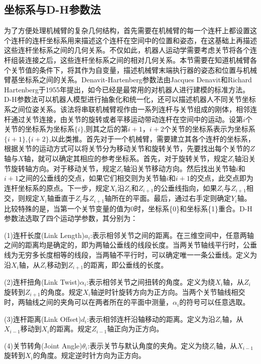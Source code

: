 \documentclass[12pt,a4paper,openany,oneside]{book}%
\numberwithin{equation}{chapter}%
\numberwithin{figure}{chapter}%
\begin{document}
\subsection{坐标系与D-H参数法}
为了方便处理机械臂的复杂几何结构，首先需要在机械臂的每一个连杆上都设置这个连杆的连杆坐标系用来描述这个连杆在空间中的位置和姿态，在这基础上再描述这些连杆坐标系之间的几何关系。不仅如此，机器人运动学需要考虑关节将各个连杆组装连接之后，这些连杆坐标系之间的相对几何关系。本节需要在知道机械臂各个关节值的条件下，将其作为自变量，描述机械臂末端执行器的姿态和位置与机械臂基坐标系之间的关系。Denavit-Hartenberg参数法\cite{r21}由Jacques Denavit和Richard Hartenberg于1955年提出，如今已经是最常用的对机器人进行建模的标准方法。D-H参数法可以机器人模型进行抽象化和统一化，还可以描述机器人不同关节坐标系之间位姿关系。该法将串联机械臂视作由一系列连杆与关节组成的刚体，相邻连杆通过关节连接，由关节的旋转或者平移运动带动连杆在空间中的运动。设第$i$个关节的坐标系为坐标系$\{i\}$,则其之后的第$i+1$，$i+2$个关节的坐标系表示为坐标系$\{i+1\}$,$\{i+2\}$,以此类推。首先对于一个机械臂，需要建立其各个连杆的坐标系，根据关节的运动方式可以将关节分为移动关节和旋转关节，先要找出每个关节的$Z$轴与$X$轴，就可以确定其相应的参考坐标系。首先，对于旋转关节，规定$Z_i$轴沿关节旋转轴方向。对于移动关节，规定$Z_i$轴沿关节移动方向。然后找出关节轴$i$和$i+1$之间的公垂线的交点，如果它们相交则为关节轴$i$和$i+1$的交点，此交点即为连杆坐标系的原点。下一步，规定$X_i$沿$Z_i$和$Z_{i+1}$的公垂线指向，如果$Z_i$与$Z_{i+1}$相交，则规定$X_i$轴垂直于$Z_i$与$Z_{i+1}$轴所在的平面。最后，通过右手定则确定$Y_i$轴。比较特殊的是，当第一个关节变量的值为0时，坐标系\{0\}和坐标系\{1\}重合。D-H参数法选取了四个运动学参数，其分别为：\par
(1)连杆长度(Link Length)$a_i$:表示相邻关节之间的距离。在三维空间中，任意两轴之间的距离均是确定的，即为两轴公垂线的线段长度。当两关节轴线平行时，公垂线为无穷多长度相等的线段，当两轴不平行时，可以确定唯一一条公垂线。定义为沿$X_i$轴，从$Z_i$移动到$Z_{i+1}$的距离，即公垂线的长度。\par
(2)连杆扭角(Link Twist)$\alpha_i$:表示相邻关节之间扭转的角度。定义为绕$X_i$轴，从$Z_i$旋转到$Z_{i+1}$的角度。规定$X_i$轴逆时针旋转方向为正方向。当两个关节轴线相交时，两轴线之间的夹角可以在两者所在的平面中测量，$\alpha_i$的符号可以任意选取。\par
(3)连杆距离(Link Offset)$d_i$:表示相邻连杆沿轴移动的距离。定义为沿$Z_i$轴，从$X_{i-1}$移动到$X_i$的距离。规定$Z_{i-1}$轴正向为正方向。\par
(4)关节转角(Joint Angle)$\theta_i$:表示关节与默认角度的夹角。定义为绕$Z_i$轴，从$X_{i-1}$旋转到$X_i$的角度。规定逆时针方向为正方向。\par
\end{document}
